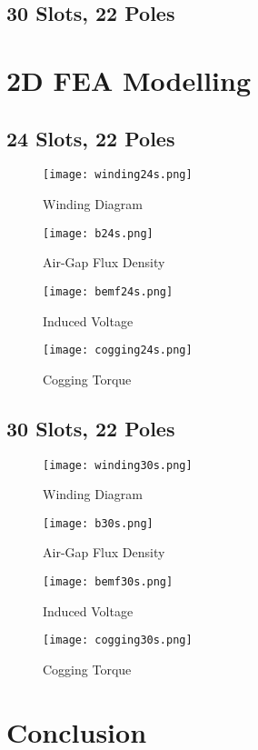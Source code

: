 \documentclass{reportClass}
\begin{document}
\subsection{30 Slots, 22 Poles}



\section{2D FEA Modelling}

\subsection{24 Slots, 22 Poles}

\begin{figure}[h!]
    \centering
    \texttt{[image: winding24s.png]}
    \caption{Winding Diagram}
    \label{fig:wdg24}
\end{figure}

\begin{figure}[h!]
    \centering
    \texttt{[image: b24s.png]}
    \caption{Air-Gap Flux Density}
    \label{fig:b24}
\end{figure}

\begin{figure}[h!]
    \centering
    \texttt{[image: bemf24s.png]}
    \caption{Induced Voltage}
    \label{fig:bemf24}
\end{figure}

\begin{figure}[h!]
    \centering
    \texttt{[image: cogging24s.png]}
    \caption{Cogging Torque}
    \label{fig:cog24}
\end{figure}
\subsection{30 Slots, 22 Poles}

\begin{figure}[h!]
    \centering
    \texttt{[image: winding30s.png]}
    \caption{Winding Diagram}
    \label{fig:wdg30}
\end{figure}

\begin{figure}[h!]
    \centering
    \texttt{[image: b30s.png]}
    \caption{Air-Gap Flux Density}
    \label{fig:b30}
\end{figure}

\begin{figure}[h!]
    \centering
    \texttt{[image: bemf30s.png]}
    \caption{Induced Voltage}
    \label{fig:bemf30}
\end{figure}

\begin{figure}[h!]
    \centering
    \texttt{[image: cogging30s.png]}
    \caption{Cogging Torque}
    \label{fig:cog30}
\end{figure}

\section{Conclusion}
\end{document}
